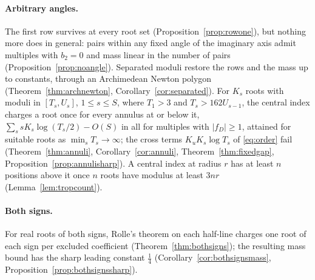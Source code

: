 \documentclass[11pt]{article}
\begin{document}
\paragraph{Arbitrary angles.}  The first row survives at every root set
(Proposition~\ref{prop:rowone}), but nothing more does in general: pairs
within any fixed angle of the imaginary axis admit multiples with $b_2=0$
and mass linear in the number of pairs (Proposition~\ref{prop:noangle}).
Separated moduli restore the rows and the mass up to constants, through an
Archimedean Newton polygon (Theorem~\ref{thm:archnewton},
Corollary~\ref{cor:separated}).  For $K_s$ roots with moduli in $[T_s,U_s]$,
$1\le s\le S$, where $T_1>3$ and $T_s>162U_{s-1}$, the central index charges a
root once for every annulus at or below it,
$\sum_ssK_s\log(T_s/2)-O(S)$ in all for multiples with $|f_D|\ge1$, attained for suitable roots as $\min_sT_s\to\infty$; the cross terms $K_uK_s\log T_s$ of \eqref{eq:order} fail
(Theorem~\ref{thm:annuli},
Corollary~\ref{cor:annuli}, Theorem~\ref{thm:fixedgap},
Proposition~\ref{prop:annulisharp}).  A central index at radius $r$ has at
least $n$ positions above it once $n$ roots have modulus at least $3nr$
(Lemma~\ref{lem:tropcount}).

\paragraph{Both signs.}  For real roots of both signs, Rolle's theorem on
each half-line charges one root of each sign per excluded coefficient
(Theorem~\ref{thm:bothsigns}); the resulting mass bound has the sharp
leading constant $\frac14$ (Corollary~\ref{cor:bothsignsmass},
Proposition~\ref{prop:bothsignssharp}).
\end{document}

